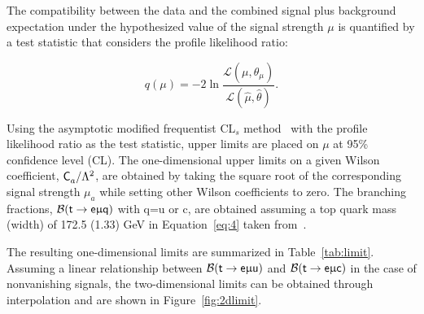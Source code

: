The compatibility between the data and the combined signal plus background expectation under the hypothesized value of the signal strength $\mu$ is quantified by a test statistic that considers the profile likelihood ratio:

\begin{equation}
q(\mu)=-2\ln\frac{\mathcal{L}(\mu,\hat{\theta}_{\mu})}{\mathcal{L}(\hat{\mu},\hat{\theta})}.
\end{equation}

Using the asymptotic modified frequentist CL$_{s}$ method~\cite{Junk:1999kv,Read2002,Cowan:2010js} with the profile likelihood ratio as the test statistic, upper limits are placed on $\mu$ at 95\% confidence level (CL). The one-dimensional upper limits on a given Wilson coefficient, $\textsf{C}^{}_{a}/\mathrm{\Lambda}^2$, are obtained by taking the square root of the corresponding signal strength $\mu_a$ while setting other Wilson coefficients to zero. The branching fractions, $\mathcal{B} (\textsf{t}\rightarrow\textsf{e}\upmu\textsf{q})$ with q=u or c, are obtained assuming a top quark mass (width) of 172.5 (1.33) GeV in Equation~\ref{eq:4} taken from~\cite{Kile:2008rp}.

The resulting one-dimensional limits are summarized in Table~\ref{tab:limit}. Assuming a linear relationship between $\mathcal{B}(\textsf{t}\rightarrow\textsf{e}\upmu\textsf{u})$ and $\mathcal{B}(\textsf{t}\rightarrow\textsf{e}\upmu\textsf{c})$ in the case of nonvanishing signals, the two-dimensional limits can be obtained through interpolation and are shown in Figure~\ref{fig:2dlimit}. 

\begin{table}[th]
\sffamily
\centering
\caption{Upper limits at 95\% CL on Wilson coefficients and the branching fractions. The expected and observed upper limits are shown in regular and bold fonts, respectively. The intervals that contain 68\% of the distribution of the expected upper limits are shown in parentheses.}
\label{tab:limit}
\end{table}

